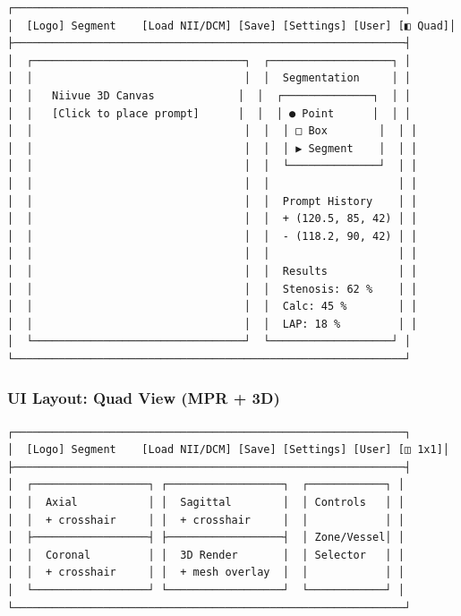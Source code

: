 \documentclass[
  11pt,
]{article}
\begin{document}
\begin{verbatim}
┌─────────────────────────────────────────────────────────────┐
│  [Logo] Segment    [Load NII/DCM] [Save] [Settings] [User] [◧ Quad]│
├─────────────────────────────────────────────────────────────┤
│  ┌─────────────────────────────────┐  ┌───────────────────┐ │
│  │                                 │  │  Segmentation     │ │
│  │   Niivue 3D Canvas             │  │  ┌──────────────┐  │ │
│  │   [Click to place prompt]      │  │  │ ● Point      │  │ │
│  │                                 │  │  │ □ Box        │  │ │
│  │                                 │  │  │ ▶ Segment    │  │ │
│  │                                 │  │  └──────────────┘  │ │
│  │                                 │  │                    │ │
│  │                                 │  │  Prompt History    │ │
│  │                                 │  │  + (120.5, 85, 42) │ │
│  │                                 │  │  - (118.2, 90, 42) │ │
│  │                                 │  │                    │ │
│  │                                 │  │  Results           │ │
│  │                                 │  │  Stenosis: 62 %    │ │
│  │                                 │  │  Calc: 45 %        │ │
│  │                                 │  │  LAP: 18 %         │ │
│  └─────────────────────────────────┘  └───────────────────┘ │
└─────────────────────────────────────────────────────────────┘
\end{verbatim}

\subsubsection{UI Layout: Quad View (MPR +
3D)}\label{ui-layout-quad-view-mpr-3d}

\begin{verbatim}
┌─────────────────────────────────────────────────────────────┐
│  [Logo] Segment    [Load NII/DCM] [Save] [Settings] [User] [◫ 1x1]│
├─────────────────────────────────────────────────────────────┤
│  ┌──────────────────┐ ┌──────────────────┐  ┌────────────┐ │
│  │  Axial           │ │  Sagittal        │  │ Controls   │ │
│  │  + crosshair     │ │  + crosshair     │  │            │ │
│  ├──────────────────┤ ├──────────────────┤  │ Zone/Vessel│ │
│  │  Coronal         │ │  3D Render       │  │ Selector   │ │
│  │  + crosshair     │ │  + mesh overlay  │  │            │ │
│  └──────────────────┘ └──────────────────┘  └────────────┘ │
└─────────────────────────────────────────────────────────────┘
\end{verbatim}
\end{document}
